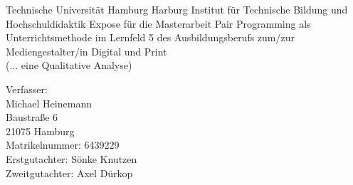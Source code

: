 \begin{titlepage}
  \begin{center}
    \vspace*{\fill}
    {\Large Technische Universität Hamburg Harburg}
    \vfill
    Institut für Technische Bildung und Hochschuldidaktik
    \vfill
    Expose für die Masterarbeit
    \vfill
    {\Large Pair Programming als Unterrichtsmethode im Lernfeld 5 des Ausbildungsberufs zum/zur Mediengestalter/in Digital und Print }\\ %
    \vspace*{-1.2cm}
    \vfill
    {\Large (... eine Qualitative Analyse) }\\ %
    \vfill
  \end{center}
  \vfill
  Verfasser:\\
  Michael Heinemann \\
  Baustraße 6 \\
  21075 Hamburg \\
  Matrikelnummer: 6439229\\[2mm]
  Erstgutachter: Sönke Knutzen  \\ 					%
  Zweitgutachter: Axel Dürkop																				 	%
\end{titlepage}
